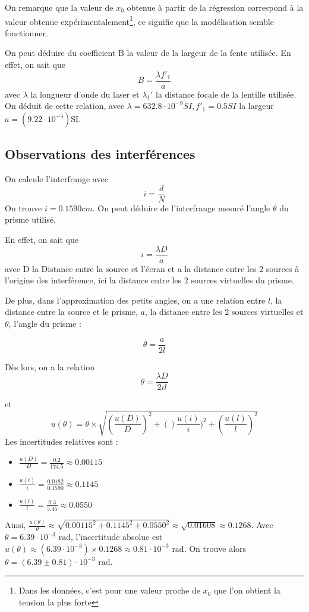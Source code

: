 \documentclass[a4paper,10pt,french]{scrartcl}
\begin{document}
On remarque que la valeur de \(x_0\) obtenue à partir de la régression correspond  à la valeur obtenue expérimentalement\footnote{Dans les données, c'est pour une valeur proche de $x_0$ que l'on obtient la tension la plus forte}, ce signifie que la modélisation semble fonctionner.

On peut déduire du coefficient B la valeur de la largeur de la fente utilisée. En effet, on sait que \[B = \frac{\lambda f'_1}{a} \] avec \(\lambda\) la longueur d'onde du laser et \(\lambda_1'\) la distance focale de la lentille utilisée. On déduit de cette relation, avec \(\lambda=632.8\cdot 10^{-9}SI, f'_1=0.5SI\) la largeur \(a = (9.22\cdot 10^{-5})\)SI.
\subsection{Observations des interférences}
On calcule l'interfrange avec \begin{equation}
                               i = \frac{d}{N}
                              \end{equation}
On trouve \(i = 0.1590 cm\).
On peut déduire de l'interfrange mesuré l'angle \(\theta\) du prisme utilisé.

En effet, on sait que \begin{equation}
                       i = \frac{\lambda D}{a}
                      \end{equation} avec D la Distance entre la source et l'écran et a la distance entre les 2 sources à l'origine des interférence, ici la distance entre les 2 sources virtuelles du prisme.

De plus, dans l'approximation des petits angles, on a une relation entre \(l\), la distance entre la source et le prisme, \(a\), la distance entre les 2 sources virtuelles et \(\theta\), l'angle du prisme :

\[\theta = \frac{a}{2l}\]

Dès lors, on a la relation \begin{equation}
                            \theta = \frac{\lambda D}{2il}
                           \end{equation}

et \[u(\theta) = \theta \times \sqrt{(\frac{u(D)}{D})^2 + ()\frac{u(i)}{i})^2 + (\frac{u(l)}{l})^2} \]
Les incertitudes relatives sont :
\begin{itemize}
    \item $\frac{u(D)}{D} = \frac{0.2}{174.5} \approx 0.00115$
    \item $\frac{u(i)}{i} = \frac{0.0182}{0.1590} \approx 0.1145$
    \item $\frac{u(l)}{l} = \frac{0.3}{5.45} \approx 0.0550$
\end{itemize}
Ainsi, $\frac{u(\theta)}{\theta} \approx \sqrt{0.00115^2 + 0.1145^2 + 0.0550^2} \approx \sqrt{0.01608} \approx 0.1268$.
Avec $\theta = 6.39\cdot 10^{-3}\text{ rad}$, l'incertitude absolue est $u(\theta) \approx (6.39\cdot 10^{-3}) \times 0.1268 \approx 0.81\cdot 10^{-3}\text{ rad}$.
On trouve alors $\theta = (6.39 \pm 0.81)\cdot 10^{-3}\text{ rad}$.
\end{document}
